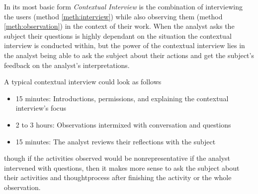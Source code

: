 \begin{method} \label{meth:contextual_interview} 
  In its most basic form \emph{Contextual Interview} is the combination of interviewing the users (method \ref{meth:interview}) while also observing them (method \ref{meth:observation}) in the context of their work. When the analyst asks the subject their questions is highly dependant on the situation the contextual interview is conducted within, but the power of the contextual interview lies in the analyst being able to ask the subject about their actions and get the subject's feedback on the analyst's interpretations. \cite[p. 273-276]{benyon_10}

  A typical contextual interview could look as follows
  \begin{itemize}
    \item 15 minutes: Introductions, permissions, and explaining the contextual interview's focus
    \item 2 to 3 hours: Observations intermixed with conversation and questions
    \item 15 minutes: The analyst reviews their reflections with the subject
  \end{itemize}
  though if the activities observed would be nonrepresentative if the analyst intervened with questions, then it makes more sense to ask the subject about their activities and thoughtprocess after finishing the activity or the whole observation. \cite[p. 275-276]{benyon_10}  
\end{method}
